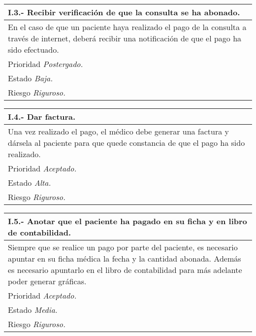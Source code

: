 	\begin{center}
	\begin{tabulary}{15cm}{|L|}
		\hline
			\bf{I.3.- Recibir verificación de que la consulta se ha abonado.} \\
		\hline
			En el caso de que un paciente haya realizado el pago de la consulta a través de internet, deberá recibir una notificación de que el pago ha sido efectuado. \\
		\hline
			Prioridad \textit{Postergado.} \\
		\hline
			Estado \textit{Baja.} \\
		\hline
			Riesgo \textit{Riguroso.} \\
		\hline
	\end{tabulary}
	\end{center}

	\begin{center}
	\begin{tabulary}{15cm}{|L|}
		\hline
			\bf{I.4.- Dar factura.} \\
		\hline
			Una vez realizado el pago, el médico debe generar una factura y dársela al paciente para que quede constancia de que el pago ha sido realizado. \\
		\hline
			Prioridad \textit{Aceptado.} \\
		\hline
			Estado \textit{Alta.} \\
		\hline
			Riesgo \textit{Riguroso.} \\
		\hline
	\end{tabulary}
	\end{center}

	\begin{center}
	\begin{tabulary}{15cm}{|L|}
		\hline
			\bf{I.5.- Anotar que el paciente ha pagado en su ficha y en libro de contabilidad.} \\
		\hline
			Siempre que se realice un pago por parte del paciente, es necesario apuntar en su ficha médica la fecha y la cantidad abonada. Además es necesario apuntarlo en el libro de contabilidad para más adelante poder generar gráficas. \\
		\hline
			Prioridad \textit{Aceptado.} \\
		\hline
			Estado \textit{Media.} \\
		\hline
			Riesgo \textit{Riguroso.} \\
		\hline
	\end{tabulary}
	\end{center}

